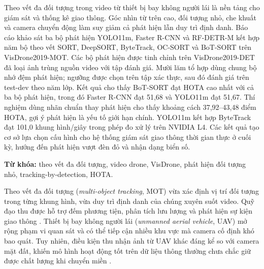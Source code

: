 \documentclass[fontsize=13pt,a4paper,oneside,parskip=false,numbers=noenddot,bibliography=totoc]{scrreprt}
\begin{document}
Theo vết đa đối tượng trong video từ thiết bị bay không người lái là nền tảng cho giám sát và thống kê giao thông. Góc nhìn từ trên cao, đối tượng nhỏ, che khuất và camera chuyển động làm suy giảm cả phát hiện lẫn duy trì định danh. Báo cáo khảo sát ba bộ phát hiện YOLO11m, Faster R-CNN và RF-DETR-M kết hợp năm bộ theo vết SORT, DeepSORT, ByteTrack, OC-SORT và BoT-SORT trên VisDrone2019-MOT. Các bộ phát hiện được tinh chỉnh trên VisDrone2019-DET đã loại ảnh trùng nguồn video với tập đánh giá. Mười lăm tổ hợp dùng chung bộ nhớ đệm phát hiện; ngưỡng được chọn trên tập xác thực, sau đó đánh giá trên test-dev theo năm lớp. Kết quả cho thấy BoT-SORT đạt HOTA cao nhất với cả ba bộ phát hiện, trong đó Faster R-CNN đạt 51,68 và YOLO11m đạt 51,67. Thí nghiệm dùng nhãn chuẩn thay phát hiện cho thấy khoảng cách 37,92--43,48 điểm HOTA, gợi ý phát hiện là yếu tố giới hạn chính. YOLO11m kết hợp ByteTrack đạt 101,0 khung hình/giây trong phép đo xử lý trên NVIDIA L4. Các kết quả tạo cơ sở lựa chọn cấu hình cho hệ thống giám sát giao thông thời gian thực ở cuối kỳ, hướng đến phát hiện vượt đèn đỏ và nhận dạng biển số.

\vspace{0.4cm}
\noindent\textbf{Từ khóa:} theo vết đa đối tượng, video drone, VisDrone, phát hiện đối tượng nhỏ, tracking-by-detection, HOTA.

\clearpage
\begingroup\small{}\tableofcontents\endgroup

\clearpage
{}
\setcounter{page}{1}

\label{chap:gioi-thieu}

Theo vết đa đối tượng (\textit{multi-object tracking}, MOT) vừa xác định vị trí đối tượng trong từng khung hình, vừa duy trì định danh của chúng xuyên suốt video. Quỹ đạo thu được hỗ trợ đếm phương tiện, phân tích lưu lượng và phát hiện sự kiện giao thông \cite{luo2021mot}. Thiết bị bay không người lái (\textit{unmanned aerial vehicle}, UAV) mở rộng phạm vi quan sát và có thể tiếp cận nhiều khu vực mà camera cố định khó bao quát. Tuy nhiên, điều kiện thu nhận ảnh từ UAV khác đáng kể so với camera mặt đất, khiến mô hình hoạt động tốt trên dữ liệu thông thường chưa chắc giữ được chất lượng khi chuyển miền \cite{zhu2022visdrone}.
\end{document}
